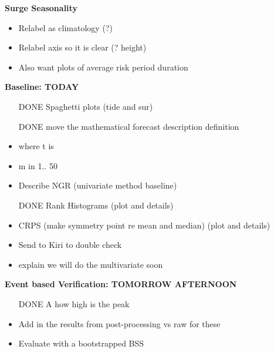 \documentclass[10pt,a4paper]{article}
\begin{document}
\textbf{Surge Seasonality}
\begin{itemize}
	\item Relabel as climatology (?)
	\item Relabel axis so it is clear (? height)
	\item Also want plots of average risk period  duration
\end{itemize}

\textbf{Baseline: TODAY} 
\begin{itemize}
	\item[DONE] Spaghetti plots (tide and sur)
	\item[DONE] move the mathematical forecast description  definition 
	\item where t is 
	\item m in 1.. 50
	\item Describe NGR (univariate method baseline)
	\item [DONE] Rank Histograms (plot and details)
	\item CRPS (make symmetry point re mean and median) (plot and details)
	\item Send to Kiri to double check
	\item explain we will do the multivariate soon 
\end{itemize}

\textbf{Event based Verification: TOMORROW AFTERNOON}
\begin{itemize}
	\item [DONE] A how high is the peak
	\item Add in the results from post-processing vs raw for these
	\item Evaluate with a bootstrapped BSS
\end{itemize}
\end{document}
